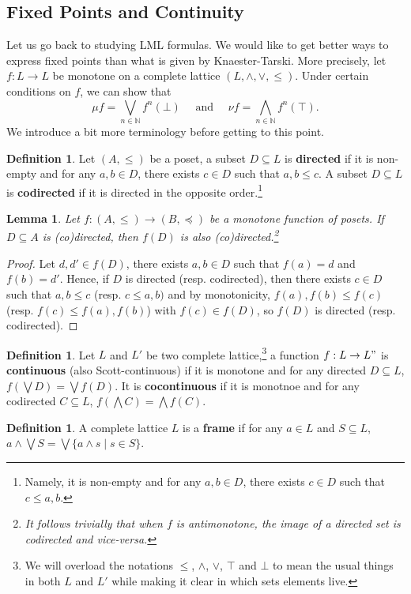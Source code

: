 \documentclass{tufte-handout} %
\newtheorem{lem}[thm]{Lemma}
\theoremstyle{definition}
\newtheorem{defn}[thm]{Definition}
\theoremstyle{remark}
\newcommand{\N}{\mathbb{N}}
\newcommand{\0}{\textsf{0}}
\newcommand{\1}{\textsf{1}}
\begin{document}
\subsection{Fixed Points and Continuity}
Let us go back to studying LML formulas. We would like to get better ways to express fixed points than what is given by Knaester-Tarski. More precisely, let $f: L\rightarrow L$ be monotone on a complete lattice $(L, \wedge, \vee, \leq)$. Under certain conditions on $f$, we can show that 
\[\mu f = \bigvee_{n \in \N} f^n(\bot)\quad \text{ and } \quad \nu f = \bigwedge_{n \in \N} f^n(\top).\]
We introduce a bit more terminology before getting to this point.
\begin{defn}
	Let $(A, \leq)$ be a poset, a subset $D \subseteq L$ is \textbf{directed} if it is non-empty and for any $a,b \in D$, there exists $c \in D$ such that $a,b\leq c$. A subset $D \subseteq L$ is \textbf{codirected} if it is directed in the opposite order.\footnote{Namely, it is non-empty and for any $a,b \in D$, there exists $c \in D$ such that $c\leq a,b$.}
\end{defn}
\begin{lem}
	Let $f: (A, \leq) \rightarrow (B, \preceq)$ be a monotone function of posets. If $D \subseteq A$ is (co)directed, then $f(D)$ is also (co)directed.\footnote{It follows trivially that when $f$ is antimonotone, the image of a directed set is codirected and vice-versa.}
\end{lem}
\begin{proof}
	Let $d, d' \in f(D)$, there exists $a, b \in D$ such that $f(a) = d$ and $f(b) = d'$. Hence, if $D$ is directed (resp. codirected), then there exists $c \in D$ such that $a, b \leq c$ (resp. $c \leq a,b)$ and by monotonicity, $f(a), f(b) \leq f(c)$ (resp. $f(c) \leq f(a), f(b)$) with $f(c) \in f(D)$, so $f(D)$ is directed (resp. codirected).
\end{proof}
\begin{defn}
	Let $L$ and $L'$ be two complete lattice,\footnote{We will overload the notations $\leq$, $\wedge$, $\vee$, $\top$ and $\bot$ to mean the usual things in both $L$ and $L'$ while making it clear in which sets elements live.} a function $f: L\rightarrow L"$ is \textbf{continuous} (also Scott-continuous) if it is monotone and for any directed $D \subseteq L$, $f(\bigvee D) = \bigvee f(D)$. It is \textbf{cocontinuous} if it is monotnoe and for any codirected $C \subseteq L$, $f(\bigwedge C) = \bigwedge f(C)$.
\end{defn}
\begin{defn}
	A complete lattice $L$ is a \textbf{frame} if for any $a \in L$ and $S \subseteq L$, $a \wedge \bigvee S = \bigvee\{a \wedge s \mid s \in S\}$.
\end{defn}
\end{document}
